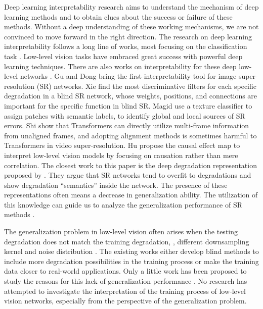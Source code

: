 Deep learning interpretability research aims to understand the mechanism of deep learning methods and to obtain clues about the success or failure of these methods.
%
Without a deep understanding of these working mechanisms, we are not convinced to move forward in the right direction.
%
The research on deep learning interpretability follows a long line of works, most focusing on the classification task \cite{simonyan2013deep,springenberg2014striving,shrikumar2017learning,sundararajan2017axiomatic,zhou2018interpreting,lundberg2017unified}.
%
Low-level vision tasks have embraced great success with powerful deep learning techniques.
%
There are also works on interpretability for these deep low-level networks \cite{gu2021interpreting,xie2021finding,magid2022texture,shirethinking,hu2024interpreting}.
%
Gu and Dong \cite{gu2021interpreting} bring the first interpretability tool for image super-resolution (SR) networks.
%
Xie \etal \cite{xie2021finding} find the most discriminative filters for each specific degradation in a blind SR network, whose weights, positions, and connections are important for the specific function in blind SR.
%
Magid \etal \cite{magid2022texture} use a texture classifier to assign patches with semantic labels, to identify global and local sources of SR errors.
%
Shi \etal \cite{shi2022rethinking} show that Transformers can directly utilize multi-frame information from unaligned frames, and adopting alignment methods is sometimes harmful to Transformers in video super-resolution.
%
Hu \etal \cite{hu2024interpreting} propose the causal effect map to interpret low-level vision models by focusing on causation rather than mere correlation.
%
The closest work to this paper is the deep degradation representation proposed by \cite{liu2021discovering}.
%
They argue that SR networks tend to overfit to degradations and show degradation ``semantics'' inside the network.
%
The presence of these representations often means a decrease in generalization ability.
%
The utilization of this knowledge can guide us to analyze the generalization performance of SR methods \cite{liu2022evaluating}.

The generalization problem in low-level vision often arises when the testing degradation does not match the training degradation, \eg, different downsampling kernel \cite{gu2019blind,liu2022blind,kong2022reflash,chen2024low,zhang2023crafting} and noise distribution \cite{guo2019toward,chen2023masked}.
%
The existing works either develop blind methods to include more degradation possibilities in the training process or make the training data closer to real-world applications.
%
Only a little work has been proposed to study the reasons for this lack of generalization performance \cite{liu2021discovering,liu2022evaluating}.
%
No research has attempted to investigate the interpretation of the training process of low-level vision networks, especially from the perspective of the generalization problem.